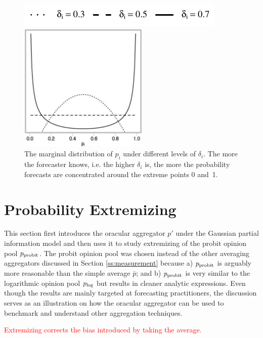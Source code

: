 \documentclass[11pt]{article}
\theoremstyle{definition}
\theoremstyle{definition}
\def\probit{p_{\rm probit}}
\def\plog{p_{\rm log}}
\begin{document}
\begin{figure}[t]
\centering
	\hspace{0em}\includegraphics{LegendMarginal}

 \includegraphics[width= 0.55\textwidth]{Marginals}
   \caption{The marginal distribution of $p_i$ under different levels of 
$\delta_i$.  The more the forecaster knows, i.e. the higher $\delta_i$ is, 
the more the probability forecasts are concentrated around the extreme 
points 0 and~1.}
\label{marginals}
\end{figure}

\section{Probability Extremizing}
\label{extremizing}
This section first introduces the oracular aggregator $p'$ under the
Gaussian partial information model and then uses it to study
extremizing of the probit opinion pool $\probit$. The probit opinion 
pool was chosen instead of the other averaging aggregators discussed 
in Section \ref{ss:measurement} because a) $\probit$ is arguably more
reasonable than the simple average $\bar{p}$; and b) $\probit$ is very
similar to the logarithmic opinion pool $\plog$ but results in cleaner
analytic expressions. Even though the results are mainly targeted at forecasting practitioners, the discussion serves as an illustration on how the oracular aggregator can be used to benchmark and understand other aggregation techniques. 

\textcolor{red}{Extremizing corrects the bias introduced by taking the average.}
\end{document}
